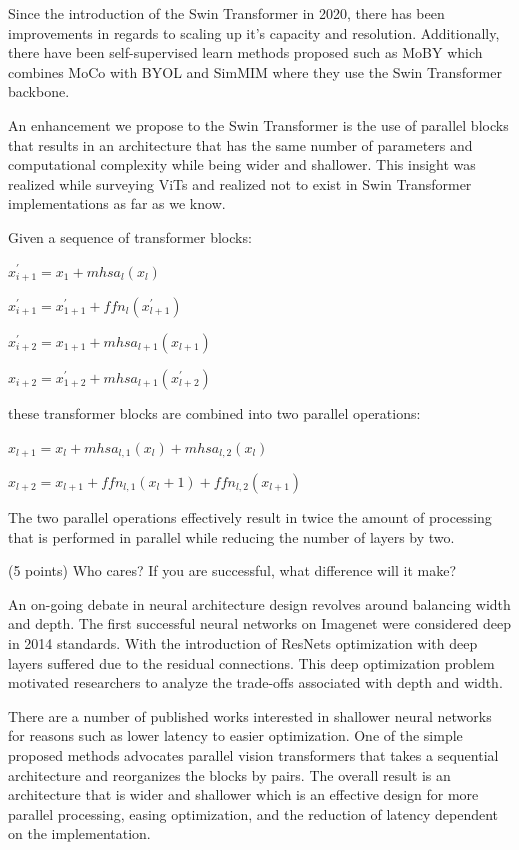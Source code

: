 \documentclass[10pt,twocolumn,letterpaper]{article}
\begin{document}
Since the introduction of the Swin Transformer in 2020, there has been improvements in regards to scaling up it's capacity and resolution\cite{liu2021swinV2}. Additionally, there have been self-supervised learn methods proposed such as MoBY\cite{xie2021moby} which combines MoCo\cite{he2020momentum}\cite{chen2020improved} with BYOL\cite{grill2020bootstrap} and SimMIM\cite{xie2021simmim} where they use the Swin Transformer backbone.

An enhancement we propose to the Swin Transformer is the use of parallel blocks that results in an architecture that has the same number of parameters and computational complexity while being wider and shallower. This insight was realized while surveying ViTs\cite{touvron2022three} and realized not to exist in Swin Transformer implementations as far as we know.

Given a sequence of transformer blocks:

$x^{'}_{i+1} = x_1 + mhsa_l(x_l)$

$x^{'}_{i+1} = x^{'}_{1+1} + ffn_l(x^{'}_{l+1})$

$x^{'}_{i+2} = x_{1+1} + mhsa_{l+1}(x_{l+1})$

$x_{i+2} = x^{'}_{1+2} + mhsa_{l+1}(x^{'}_{l+2})$


these transformer blocks are combined into two parallel operations:

$x_{l+1} = x_{l} + mhsa_{l,1}(x_l) + mhsa_{l,2}(x_l)$

$x_{l+2} = x_{l+1} + ffn_{l,1}(x_l+1) + ffn_{l,2}(x_{l+1})$

The two parallel operations effectively result in twice the amount of processing that is performed in parallel while reducing the number of layers by two.

(5 points) Who cares? If you are successful, what difference will it make? 

An on-going debate in neural architecture design revolves around balancing width and depth. The first successful neural networks on Imagenet were considered deep in 2014 standards\cite{krizhevsky2012imagenet}\cite{simonyan2014very}. With the introduction of ResNets\cite{he2016deep}\cite{he2016identity} optimization with deep layers suffered due to the residual connections. This deep optimization problem motivated researchers to analyze the trade-offs associated with depth and width\cite{ding2021repvgg}\cite{huang2016deep}\cite{zagoruyko2016wide}. 

There are a number of published works interested in shallower neural networks\cite{goyal2021non}\cite{zagoruyko2016wide} for reasons such as lower latency to easier optimization. One of the simple proposed methods advocates parallel vision transformers\cite{touvron2022three} that takes a sequential architecture and reorganizes the blocks by pairs. The overall result is an architecture that is wider and shallower which is an effective design for more parallel processing, easing optimization, and the reduction of latency dependent on the implementation.
\end{document}
